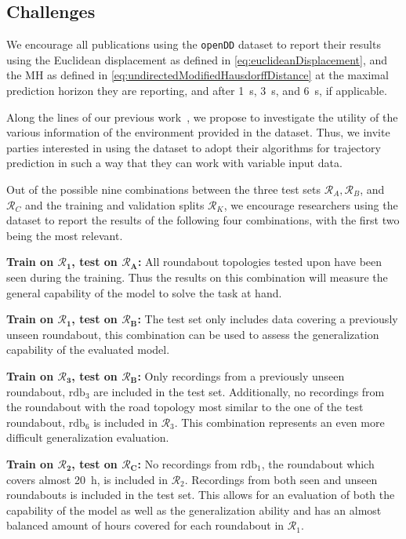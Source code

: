 \documentclass[a4paper, 10pt, conference]{ieeeconf}      %
\begin{document}
\subsection{Challenges}
We encourage all publications using the \texttt{openDD} dataset to report their results using the Euclidean displacement as defined in \autoref{eq:euclideanDisplacement}, and the \gls{MH} as defined in \autoref{eq:undirectedModifiedHausdorffDistance} at the maximal prediction horizon they are reporting, and after \SI{1}{\second}, \SI{3}{\second}, and \SI{6}{\second}, if applicable.

Along the lines of our previous work~\cite{breuer_analysis_2019}, we propose to investigate the utility of the various information of the environment provided in the dataset.
Thus, we invite parties interested in using the dataset to adopt their algorithms for trajectory prediction in such a way that they can work with variable input data.

Out of the possible nine combinations between the three test sets $\mathcal R_A, \mathcal R_B$, and $\mathcal R_C$ and the training and validation splits $\mathcal R_K$, we encourage researchers using the dataset to report the results of the following four combinations, with the first two being the most relevant.

\textbf{Train on $\mathbf{\mathcal R_1}$, test on $\mathbf{\mathcal R_A}$:} All roundabout topologies tested upon have been seen during the training.
Thus the results on this combination will measure the general capability of the model to solve the task at hand.

\textbf{Train on $\mathbf{\mathcal R_1}$, test on $\mathbf{\mathcal R_B}$:} The test set only includes data covering a previously unseen roundabout, this combination can be used to assess the generalization capability of the evaluated model.

\textbf{Train on $\mathbf{\mathcal R_3}$, test on $\mathbf{\mathcal R_B}$:} Only recordings from a previously unseen roundabout, $\text{rdb}_3$ are included in the test set.
Additionally, no recordings from the roundabout with the road topology most similar to the one of the test roundabout, $\text{rdb}_6$ is included in $\mathcal R_3$.
This combination represents an even more difficult generalization evaluation.

\textbf{Train on $\mathbf{\mathcal R_2}$, test on $\mathbf{\mathcal R_C}$:} No recordings from $\text{rdb}_1$, the roundabout which covers almost \SI{20}{\hour}, is included in $\mathcal R_2$.
Recordings from both seen and unseen roundabouts is included in the test set.
This allows for an evaluation of both the capability of the model as well as the generalization ability and has an almost balanced amount of hours covered for each roundabout in $\mathcal R_1$.
\end{document}
